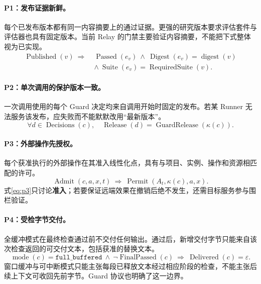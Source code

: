 \documentclass[11pt,a4paper]{article}
\theoremstyle{definition}
\newcommand{\eps}{\varepsilon}
\begin{document}
\paragraph{P1：发布证据新鲜。} 每个已发布版本都有同一内容摘要上的通过证据。更强的研究版本要求评估套件与评估器也具有固定版本。当前 Relay 的门禁主要验证内容摘要，不能把下式整体视为已实现。
\begin{equation}
\begin{aligned}
\operatorname{Published}(v)\ \Longrightarrow\;&
\operatorname{Passed}(e_v)\ \land\
\operatorname{Digest}(e_v)=\operatorname{digest}(v)\\
&\land\ \operatorname{Suite}(e_v)=\operatorname{RequiredSuite}(v).
\end{aligned}
\label{eq:p1}
\end{equation}

\paragraph{P2：单次调用的保护版本一致。} 一次调用使用的每个 Guard 决定均来自调用开始时固定的发布。若某 Runner 无法服务该发布，应失败而不能默默改用“最新版本”。
\begin{equation}
\forall d\in\operatorname{Decisions}(c),\quad
\operatorname{Release}(d)=\operatorname{GuardRelease}(\kappa(c)).
\label{eq:p2}
\end{equation}

\paragraph{P3：外部操作先授权。} 每个获准执行的外部操作在其准入线性化点，具有与项目、实例、操作和资源相匹配的许可。
\begin{equation}
\operatorname{Admit}(c,a,x,t)\ \Longrightarrow\
\operatorname{Permit}(A_t,\kappa(c),a,x).
\label{eq:p3}
\end{equation}
式\eqref{eq:p3}只讨论\textbf{准入}；若要保证远端效果在撤销后绝不发生，还需目标服务参与围栏验证。

\paragraph{P4：受检字节交付。} 全缓冲模式在最终检查通过前不交付任何输出。通过后，新增交付字节只能来自该次检查返回的可交付文本，包括获准的替换文本。
\begin{equation}
\operatorname{mode}(c)=\mathtt{full\_buffered}\ \land\
\neg\operatorname{FinalPassed}(c)
\ \Longrightarrow\ \operatorname{Delivered}(c)=\eps.
\label{eq:p4}
\end{equation}
窗口缓冲与可中断模式只能主张每段已释放文本经过相应阶段的检查，不能主张后续上下文可收回先前字节。Guard 协议也明确了这一边界\cite{guardrepo}。
\end{document}
